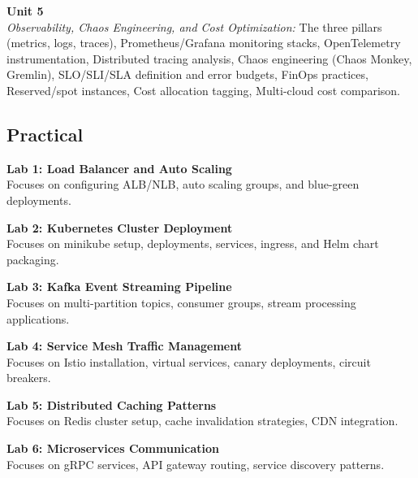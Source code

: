 \vspace{0.3cm}

\noindent\textbf{Unit 5} \\
\textit{Observability, Chaos Engineering, and Cost Optimization:} The three pillars (metrics, logs, traces), Prometheus/Grafana monitoring stacks, OpenTelemetry instrumentation, Distributed tracing analysis, Chaos engineering (Chaos Monkey, Gremlin), SLO/SLI/SLA definition and error budgets, FinOps practices, Reserved/spot instances, Cost allocation tagging, Multi-cloud cost comparison.

\newpage

\subsection*{Practical}
\noindent\textbf{Lab 1: Load Balancer and Auto Scaling} \\
Focuses on configuring ALB/NLB, auto scaling groups, and blue-green deployments.

\vspace{0.2cm}

\noindent\textbf{Lab 2: Kubernetes Cluster Deployment} \\
Focuses on minikube setup, deployments, services, ingress, and Helm chart packaging.

\vspace{0.2cm}

\noindent\textbf{Lab 3: Kafka Event Streaming Pipeline} \\
Focuses on multi-partition topics, consumer groups, stream processing applications.

\vspace{0.2cm}

\noindent\textbf{Lab 4: Service Mesh Traffic Management} \\
Focuses on Istio installation, virtual services, canary deployments, circuit breakers.

\vspace{0.2cm}

\noindent\textbf{Lab 5: Distributed Caching Patterns} \\
Focuses on Redis cluster setup, cache invalidation strategies, CDN integration.

\vspace{0.2cm}

\noindent\textbf{Lab 6: Microservices Communication} \\
Focuses on gRPC services, API gateway routing, service discovery patterns.

